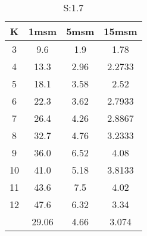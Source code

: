 \begin{table}[H]
\centering
\begin{tabular}{c|ccc}
K &1msm &5msm &15msm\\
\hline
3 & 9.6 & 1.9 & 1.78\\
4 & 13.3 & 2.96 & 2.2733\\
5 & 18.1 & 3.58 & 2.52\\
6 & 22.3 & 3.62 & 2.7933\\
7 & 26.4 & 4.26 & 2.8867\\
8 & 32.7 & 4.76 & 3.2333\\
9 & 36.0 & 6.52 & 4.08\\
10 & 41.0 & 5.18 & 3.8133\\
11 & 43.6 & 7.5 & 4.02\\
12 & 47.6 & 6.32 & 3.34\\
\hline
& 29.06 & 4.66 & 3.074\\
\end{tabular}
\caption{S:1.7}
\label{tab:s1.7}
\end{table}

